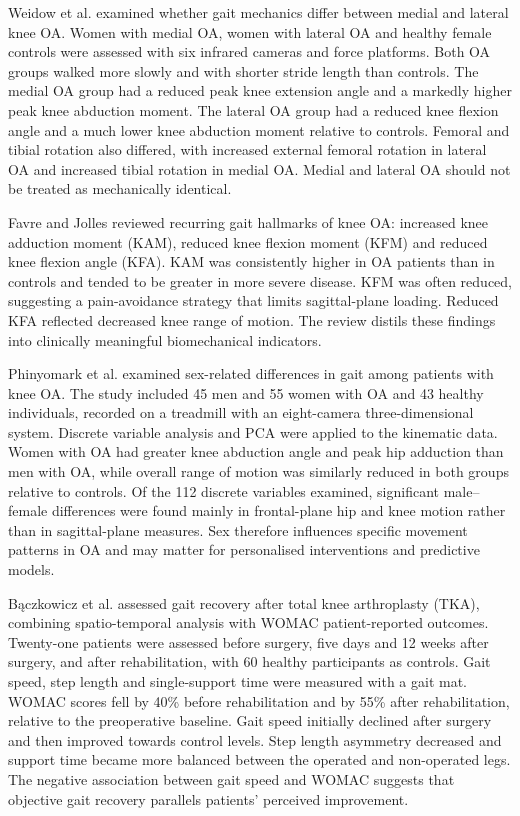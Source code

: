 \documentclass[12pt]{elsarticle}
\begin{document}
Weidow et al. \cite{weidow2006hip} examined whether gait mechanics differ between medial and lateral knee OA. { Women} with medial OA, women with lateral { OA} and healthy female { controls were assessed with} six infrared cameras and force platforms. Both OA groups walked more slowly and with shorter stride length than { controls.} The medial OA group { had a} reduced peak knee extension angle and a markedly higher peak knee abduction { moment. The} lateral OA group { had a} reduced knee flexion angle and a much lower knee abduction moment relative to controls. { Femoral} and tibial rotation also { differed,} with increased external femoral rotation { in lateral OA} and increased tibial { rotation in medial OA. Medial} and lateral OA should not be treated as mechanically { identical.}

Favre and Jolles \cite{favre2016gait} reviewed { recurring gait hallmarks of knee OA:} increased knee adduction moment (KAM), reduced knee flexion moment { (KFM)} and reduced knee flexion angle (KFA). KAM was consistently higher in OA patients than in controls and tended to be greater in more severe disease. KFM was often reduced, suggesting a pain-avoidance strategy that limits sagittal-plane loading. Reduced KFA reflected decreased knee range of motion. { The review distils these} findings into clinically meaningful biomechanical indicators.

Phinyomark et al. \cite{phinyomark2016gender} examined sex-related differences in gait among patients with knee OA. { The} study included 45 men and 55 women with { OA and} 43 healthy individuals, recorded on a treadmill { with} an eight-camera three-dimensional system. { Discrete} variable analysis and { PCA} were applied to the kinematic data. { Women with OA had} greater knee abduction angle and peak hip adduction than men with OA, while overall range of motion was similarly reduced in both groups relative to controls. { Of} the 112 discrete variables examined, significant male--female differences were found mainly in frontal-plane hip and knee motion rather than in sagittal-plane measures. { Sex therefore} influences specific movement patterns in OA and may { matter for personalised interventions and} predictive models.

B{\k{a}}czkowicz et al. \cite{bkaczkowicz2018gait} assessed gait recovery after total knee arthroplasty { (TKA),} combining spatio-temporal analysis with { WOMAC patient-reported outcomes. Twenty-one patients were assessed} before surgery, five days { and} 12 weeks after surgery, and after rehabilitation, with 60 healthy participants as controls. Gait speed, step { length} and single-support time were measured { with a gait mat. WOMAC scores fell} by 40\% before rehabilitation and by 55\% after { rehabilitation,} relative to the preoperative baseline. Gait speed initially declined after { surgery and then improved towards} control levels. Step length asymmetry { decreased} and support time { became more balanced} between the operated and non-operated { legs.} The negative association between gait speed and WOMAC suggests that objective gait recovery parallels patients' { perceived} improvement.
\end{document}
